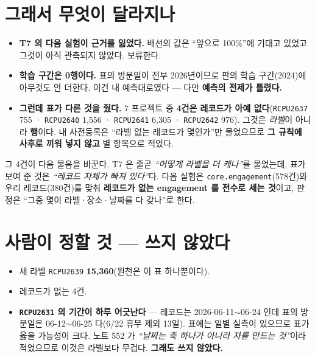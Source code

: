 \documentclass[10pt,a4paper]{article}
\begin{document}
\section{그래서 무엇이 달라지나}

\begin{itemize}
\item \textbf{T7 의 다음 실험이 근거를 잃었다.} 배선의 값은 ``앞으로 100\%''에
      기대고 있었고 그것이 아직 관측되지 않았다. 보류한다.
\item \textbf{학습 구간은 0행이다.} 표의 방문일이 전부 2026년이므로 판의 학습
      구간(2024)에 아무것도 안 더한다. 이건 내 예측대로였다 --- 다만
      \textbf{예측의 전제가 틀렸다.}
\item \textbf{그런데 표가 다른 것을 줬다.} 7 프로젝트 중 \textbf{4건은 레코드가
      아예 없다}(\verb|RCPU2637| 755 · \verb|RCPU2640| 1{,}556 ·
      \verb|RCPU2641| 6{,}305 · \verb|RCPU2642| 976). 그것은 \emph{라벨}이 아니라
      \textbf{행}이다. 내 사전등록은 ``라벨 없는 레코드가 몇인가''만 물었으므로
      \textbf{그 규칙에 사후로 끼워 넣지 않고} 별 항목으로 적었다.
\end{itemize}

그 4건이 다음 물음을 바꾼다. T7 은 줄곧 \emph{``어떻게 라벨을 더 캐나''}를 물었는데,
표가 보여 준 것은 \emph{``레코드 자체가 빠져 있다''}다. 다음 실험은
\verb|core.engagement|(578건)와 우리 레코드(380건)를 맞춰 \textbf{레코드가 없는
engagement 를 전수로 세는 것}이고, 판정은 ``그중 몇이 라벨·장소·날짜를 다 갖나''로
한다.

\section{사람이 정할 것 --- 쓰지 않았다}

\begin{itemize}
\item 새 라벨 \verb|RCPU2639| \textbf{15{,}360}(원천은 이 표 하나뿐이다).
\item 레코드가 없는 4건.
\item \textbf{\texttt{RCPU2631} 의 기간이 하루 어긋난다} --- 레코드는
      2026-06-11$\sim$06-24 인데 표의 방문일은 06-12$\sim$06-25 다(6/22 휴무 제외
      13일). 표에는 일별 실측이 있으므로 표가 옳을 가능성이 크다. 노트 552 가
      \emph{``날짜는 축 하나가 아니라 자를 만드는 것''}이라 적었으므로 이것은
      라벨보다 무겁다. \textbf{그래도 쓰지 않았다.}
\end{itemize}
\end{document}
